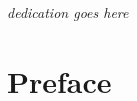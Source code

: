 
\vspace*{23ex}

\centerline{\textit{dedication goes here}}

\chapter*{Preface}
\label{cha:preface}
\thispagestyle{empty}


